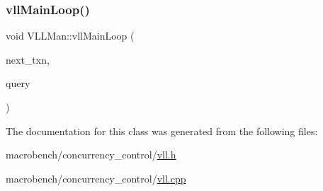 \subsubsection{\texorpdfstring{vll\+Main\+Loop()}{vllMainLoop()}}
{\footnotesize\ttfamily void V\+L\+L\+Man\+::vll\+Main\+Loop (\begin{DoxyParamCaption}\item[{\hyperlink{classtxn__man}{txn\+\_\+man} $\ast$}]{next\+\_\+txn,  }\item[{\hyperlink{classbase__query}{base\+\_\+query} $\ast$}]{query }\end{DoxyParamCaption})}



The documentation for this class was generated from the following files\+:\begin{DoxyCompactItemize}
\item 
macrobench/concurrency\+\_\+control/\hyperlink{vll_8h}{vll.\+h}\item 
macrobench/concurrency\+\_\+control/\hyperlink{vll_8cpp}{vll.\+cpp}\end{DoxyCompactItemize}
